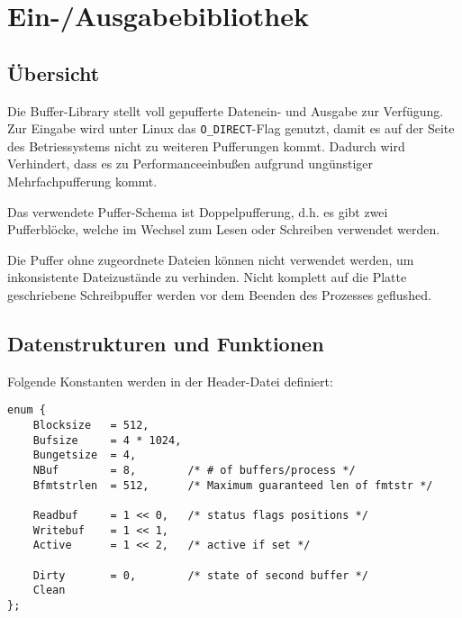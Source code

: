 \chapter{Ein-/Ausgabebibliothek}
\label{chap:buffer}

\section{Übersicht}
\label{sec:buffer_overview}

Die Buffer-Library stellt voll gepufferte Datenein-
und Ausgabe zur Verfügung.
Zur Eingabe wird unter Linux das \texttt{O\_DIRECT}-Flag genutzt,
damit es auf der Seite des Betriessystems nicht zu weiteren Pufferungen kommt.
Dadurch wird Verhindert,
dass es zu Performanceeinbußen aufgrund ungünstiger Mehrfachpufferung kommt.

Das verwendete Puffer-Schema ist Doppelpufferung,
d.h. es gibt zwei Pufferblöcke,
welche im Wechsel zum Lesen oder Schreiben verwendet werden.

Die Puffer ohne zugeordnete Dateien können nicht verwendet werden,
um inkonsistente Dateizustände zu verhinden.
Nicht komplett auf die Platte geschriebene Schreibpuffer werden vor dem Beenden des Prozesses geflushed.

\section{Datenstrukturen und Funktionen}
\label{sec:buf_datafunc}

Folgende Konstanten werden in der Header-Datei definiert:

\begin{lstlisting}
enum {
	Blocksize	= 512,
	Bufsize		= 4 * 1024,
	Bungetsize	= 4,
	NBuf		= 8,		/* # of buffers/process */
	Bfmtstrlen	= 512,		/* Maximum guaranteed len of fmtstr */

	Readbuf		= 1 << 0,	/* status flags positions */
	Writebuf	= 1 << 1,
	Active		= 1 << 2,	/* active if set */

	Dirty		= 0,		/* state of second buffer */
	Clean
};
\end{lstlisting}

